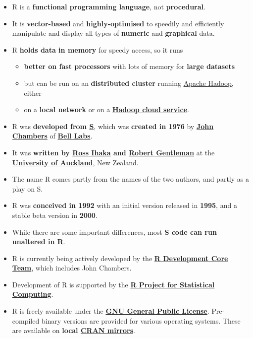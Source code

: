 \documentclass[]{book}
\providecommand{\tightlist}{%
  \setlength{\itemsep}{0pt}\setlength{\parskip}{0pt}}
\theoremstyle{definition}
\theoremstyle{definition}
\theoremstyle{definition}
\theoremstyle{remark}
\begin{document}
\begin{itemize}
\tightlist
\item
  R is a \textbf{functional programming language}, not
  \textbf{procedural}.
\item
  It is \textbf{vector-based} and \textbf{highly-optimised} to speedily
  and efficiently manipulate and display all types of \textbf{numeric}
  and \textbf{graphical} data.
\item
  R \textbf{holds data in memory} for speedy access, so it runs

  \begin{itemize}
  \tightlist
  \item
    \textbf{better on fast processors} with lots of memory for
    \textbf{large datasets}
  \item
    but can be run on an \textbf{distributed cluster} running
    \href{https://hadoop.apache.org/}{Apache Hadoop}, either
  \item
    on a \textbf{local network} or on a
    \textbf{\href{https://www.technavio.com/blog/top-16-companies-in-the-hadoop-as-a-service-hdaas-market}{Hadoop
    cloud service}}.
  \end{itemize}
\item
  R was \textbf{developed from
  \href{https://en.wikipedia.org/wiki/S_(programming_language)}{S}},
  which was \textbf{created in 1976} by
  \textbf{\href{https://en.wikipedia.org/wiki/John_Chambers_(statistician)}{John
  Chambers}} of
  \textbf{\href{https://en.wikipedia.org/wiki/Bell_Labs}{Bell Labs}}.
\item
  It was \textbf{written by
  \href{https://en.wikipedia.org/wiki/Ross_Ihaka}{Ross Ihaka} and
  \href{https://en.wikipedia.org/wiki/Robert_Gentleman_(statistician)}{Robert
  Gentleman}} at the
  \textbf{\href{https://en.wikipedia.org/wiki/University_of_Auckland}{University
  of Auckland}}, New Zealand.
\item
  The name R comes partly from the names of the two authors, and partly
  as a play on S.
\item
  R was \textbf{conceived in 1992} with an initial version released in
  \textbf{1995}, and a stable beta version in \textbf{2000}.
\item
  While there are some important differences, most \textbf{S code can
  run unaltered in R}.
\item
  R is currently being actively developed by the
  \textbf{\href{https://www.r-project.org/contributors.html}{R
  Development Core Team}}, which includes John Chambers.
\item
  Development of R is supported by the
  \textbf{\href{https://www.r-project.org/}{R Project for Statistical
  Computing}}.
\item
  R is freely available under the
  \textbf{\href{https://www.gnu.org/licenses/gpl-3.0.en.html}{GNU
  General Public License}}. Pre-compiled binary versions are provided
  for various operating systems. These are available on \textbf{local
  \href{https://cran.r-project.org/mirrors.html}{CRAN mirrors}}.
\end{itemize}
\end{document}
